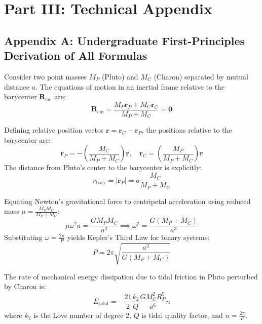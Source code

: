 \documentclass[11pt,a4paper]{article}
\begin{document}
\newpage

\section*{Part III: Technical Appendix}

\subsection*{Appendix A: Undergraduate First-Principles Derivation of All Formulas}

Consider two point masses $M_P$ (Pluto) and $M_C$ (Charon) separated by mutual distance $a$. The equations of motion in an inertial frame relative to the barycenter $\mathbf{R}_{\text{cm}}$ are:
\begin{equation}
\mathbf{R}_{\text{cm}} = \frac{M_P \mathbf{r}_P + M_C \mathbf{r}_C}{M_P + M_C} = \mathbf{0}
\end{equation}

Defining relative position vector $\mathbf{r} = \mathbf{r}_C - \mathbf{r}_P$, the positions relative to the barycenter are:
\begin{equation}
\mathbf{r}_P = -\left( \frac{M_C}{M_P + M_C} \right) \mathbf{r}, \quad \mathbf{r}_C = \left( \frac{M_P}{M_P + M_C} \right) \mathbf{r}
\end{equation}
The distance from Pluto's center to the barycenter is explicitly:
\begin{equation}
r_{\text{bary}} = |\mathbf{r}_P| = a \frac{M_C}{M_P + M_C}
\end{equation}

Equating Newton's gravitational force to centripetal acceleration using reduced mass $\mu = \frac{M_P M_C}{M_P + M_C}$:
\begin{equation}
\mu \omega^2 a = \frac{G M_P M_C}{a^2} \implies \omega^2 = \frac{G (M_P + M_C)}{a^3}
\end{equation}
Substituting $\omega = \frac{2\pi}{P}$ yields Kepler's Third Law for binary systems:
\begin{equation}
P = 2\pi \sqrt{\frac{a^3}{G (M_P + M_C)}}
\end{equation}

The rate of mechanical energy dissipation due to tidal friction in Pluto perturbed by Charon is:
\begin{equation}
\dot{E}_{\text{tidal}} = -\frac{21}{2} \frac{k_2}{Q} \frac{G M_C^2 R_P^5}{a^6} n
\end{equation}
where $k_2$ is the Love number of degree 2, $Q$ is tidal quality factor, and $n = \frac{2\pi}{P}$.
\end{document}
